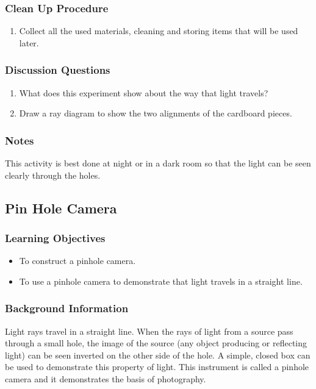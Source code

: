 \subsubsection*{Clean Up Procedure}
\begin{enumerate}
\item{Collect all the used materials, cleaning and storing items that will be used later.} 
\end{enumerate}

\subsubsection*{Discussion Questions}
\begin{enumerate}
\item{What does this experiment show about the way that light travels?}
\item{Draw a ray diagram to show the two alignments of the cardboard pieces.}
\end{enumerate}

\subsubsection*{Notes}
This activity is best done at night or in a dark room so that the light can be seen clearly through the holes.


\subsection{Pin Hole Camera}

\subsubsection*{Learning Objectives}
\begin{itemize}
\item{To construct a pinhole camera.}
\item{To use a pinhole camera to demonstrate that light travels in a straight line.}
\end{itemize}

\subsubsection*{Background Information}
Light rays travel in a straight line.  When the rays of light from a source pass through a small hole, the image of the source (any object producing or reflecting light) can be seen inverted on the other side of the hole.  A simple, closed box can be used to demonstrate this property of light.  This instrument is called a pinhole camera and it demonstrates the basis of photography.

